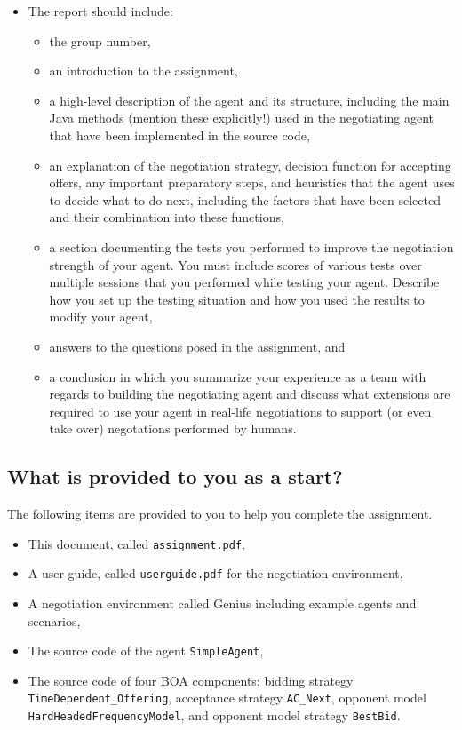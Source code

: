 \documentclass[a4paper]{article}
\begin{document}
\begin{itemize}
\item The report should include:
  \begin{itemize}
    \item the group number,
    \item an introduction to the assignment,
    \item a high-level description of the agent and its structure, including the main Java methods (mention these explicitly!) used in the negotiating agent that have been implemented in the source code,
    \item an explanation of the negotiation strategy, decision function for accepting offers, any important preparatory steps, and heuristics that the agent uses to decide what to do next, including the factors that have been selected and their combination into these functions,
    \item a section documenting the tests you performed to improve the negotiation strength of your agent. You must include scores of various tests over multiple sessions that you performed while testing your agent. Describe how you set up the testing situation and how you used the results to modify your agent,
    \item answers to the questions posed in the assignment, and
    \item a conclusion in which you summarize your experience as a team with regards to building the negotiating agent and discuss what extensions are required to use your agent in real-life negotiations to support (or even take over) negotations performed by humans.
  \end{itemize}
\end{itemize}

\subsection{What is provided to you as a start?}\label{sec:implementation}

The following items are provided to you to help you complete the assignment.
\begin{itemize}
  \item This document, called \verb|assignment.pdf|,
  \item A user guide, called \verb|userguide.pdf| for the negotiation environment,
  \item A negotiation environment called Genius including example agents and scenarios,
  \item The source code of the agent \verb+SimpleAgent+,
  \item The source code of four BOA components: bidding strategy \verb+TimeDependent_Offering+, acceptance strategy \verb+AC_Next+, opponent model \verb+HardHeadedFrequencyModel+, and opponent model strategy \verb+BestBid+.
\end{itemize}
\end{document}
